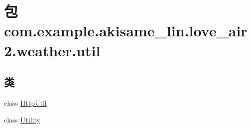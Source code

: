 \hypertarget{namespacecom_1_1example_1_1akisame__lin_1_1love__air2_1_1weather_1_1util}{}\section{包 com.\+example.\+akisame\+\_\+lin.\+love\+\_\+air2.\+weather.\+util}
\label{namespacecom_1_1example_1_1akisame__lin_1_1love__air2_1_1weather_1_1util}
\subsection*{类}
\begin{DoxyCompactItemize}
\item 
class \mbox{\hyperlink{classcom_1_1example_1_1akisame__lin_1_1love__air2_1_1weather_1_1util_1_1_http_util}{Http\+Util}}
\item 
class \mbox{\hyperlink{classcom_1_1example_1_1akisame__lin_1_1love__air2_1_1weather_1_1util_1_1_utility}{Utility}}
\end{DoxyCompactItemize}
